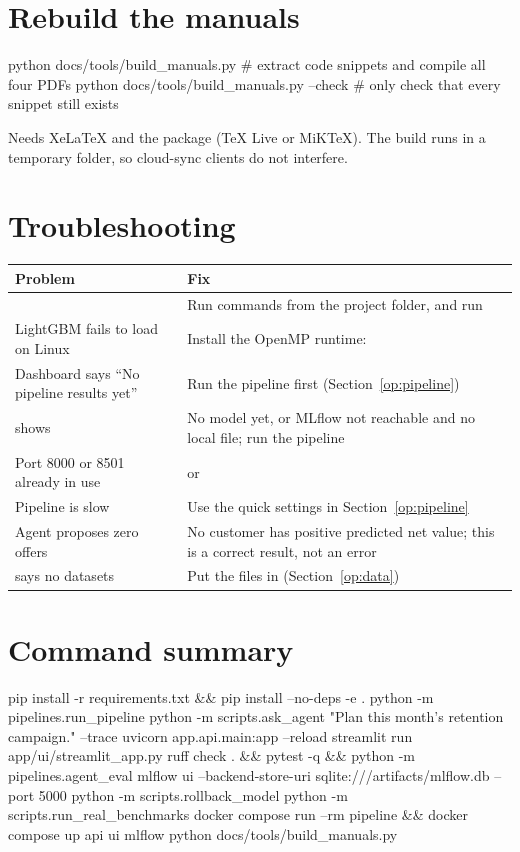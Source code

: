 \documentclass[11pt]{article}
\begin{document}
\section{Rebuild the manuals}
\begin{shell}
python docs/tools/build_manuals.py          # extract code snippets and compile all four PDFs
python docs/tools/build_manuals.py --check  # only check that every snippet still exists
\end{shell}
Needs XeLaTeX and the  package (TeX Live or MiKTeX). The build runs in a temporary folder, so cloud-sync clients do not interfere.

\section{Troubleshooting}
\begin{tabularx}{\textwidth}{@{}lL@{}}
\toprule
Problem & Fix \\
\midrule
{} & Run commands from the project folder, and run  \\
LightGBM fails to load on Linux & Install the OpenMP runtime:  \\
Dashboard says ``No pipeline results yet'' & Run the pipeline first (Section~\ref{op:pipeline}) \\
 shows  & No model yet, or MLflow not reachable and no local file; run the pipeline \\
Port 8000 or 8501 already in use &  or  \\
Pipeline is slow & Use the quick settings in Section~\ref{op:pipeline} \\
Agent proposes zero offers & No customer has positive predicted net value; this is a correct result, not an error \\
 says no datasets & Put the files in  (Section~\ref{op:data}) \\
\bottomrule
\end{tabularx}

\section{Command summary}
\begin{shell}
pip install -r requirements.txt && pip install --no-deps -e .
python -m pipelines.run_pipeline
python -m scripts.ask_agent "Plan this month's retention campaign." --trace
uvicorn app.api.main:app --reload
streamlit run app/ui/streamlit_app.py
ruff check . && pytest -q && python -m pipelines.agent_eval
mlflow ui --backend-store-uri sqlite:///artifacts/mlflow.db --port 5000
python -m scripts.rollback_model
python -m scripts.run_real_benchmarks
docker compose run --rm pipeline && docker compose up api ui mlflow
python docs/tools/build_manuals.py
\end{shell}
\end{document}
